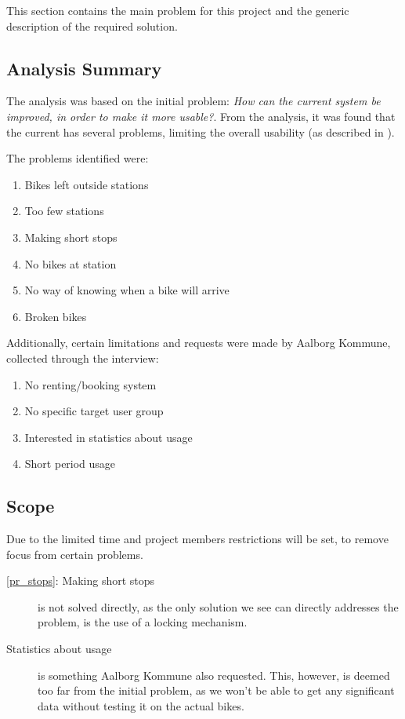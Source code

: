 This section contains the main problem for this project and the generic description of the required solution.

\subsection{Analysis Summary}
The analysis was based on the initial problem: \textit{How can the current \citybike system be improved, in order to make it more usable?}.
From the analysis, it was found that the current \citybike has several problems, limiting the overall usability (as described in ).

The problems identified were:
\begin{enumerate}
\item Bikes left outside stations \label{pr_stations}
\item Too few stations \label{pr_few}
\item Making short stops \label{pr_stops}
\item No bikes at station \label{pr_nobikes}
\item No way of knowing when a bike will arrive \label{pr_arrive}
\item Broken bikes \label{pr_broken}
\end{enumerate}

Additionally, certain limitations and requests were made by Aalborg Kommune, collected through the interview:

\begin{enumerate}
\item No renting/booking system
\item No specific target user group
\item Interested in statistics about usage \label{pr_stats}
\item Short period usage
\end{enumerate}

\subsection{Scope}
Due to the limited time and project members restrictions will be set, to remove focus from certain problems.

\begin{description}
\item[\ref{pr_stops}: Making short stops] is not solved directly, as the only solution we see can directly addresses the problem, is the use of a locking mechanism.

\item[Statistics about usage] is something Aalborg Kommune also requested.
This, however, is deemed too far from the initial problem, as we won't be able to get any significant data without testing it on the actual bikes.
\end{description}

